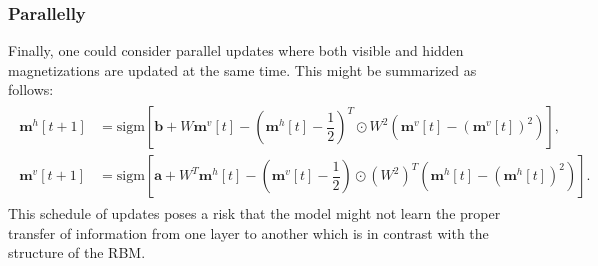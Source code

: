 \documentclass[../report/report.tex]{subfiles}
\begin{document}
\subsubsection{Parallelly}
Finally, one could consider parallel updates where both visible and hidden magnetizations are updated at the same time. This might be summarized as follows:
\begin{align}
\begin{split}
\mathbf{m}^h[t+1] & = \text{sigm} \left[  \mathbf{b} + W \mathbf{m}^v[t] - \left( \mathbf{m}^h[t] - \dfrac{1}{2}\right)^T \odot W^2 \left( \mathbf{m}^v[t] - ( \mathbf{m}^v[t])^2 \right) \right], \\
\mathbf{m}^v[t+1] & = \text{sigm} \left[  \mathbf{a} + W^T \mathbf{m}^h[t] -\left( \mathbf{m}^v[t] - \dfrac{1}{2}\right) \odot (W^2)^T  \left(\mathbf{m}^h[t] - (\mathbf{m}^h[t])^2 \right) \right].
\end{split}
\end{align}
This schedule of updates poses a risk that the model might not learn the proper transfer of information from one layer to another which is in contrast with the structure of the RBM.
\end{document}
